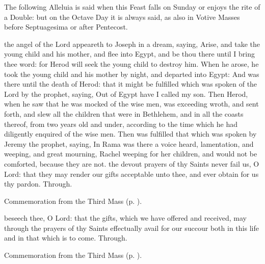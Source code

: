 \begin{rubric}
    The following Alleluia is said when this Feast falls on Sunday or enjoys the rite of a  Double: but on the Octave Day it is always said, as also in Votive Masses before Septuagesima or after Pentecost.
\end{rubric}
 the angel of the Lord appeareth to Joseph in a dream, saying, Arise, and take the young child and his mother, and flee into Egypt, and be thou there until I bring thee word: for Herod will seek the young child to destroy him. When he arose, he took the young child and his mother by night, and departed into Egypt: And was there until the death of Herod: that it might be fulfilled which was spoken of the Lord by the prophet, saying, Out of Egypt have I called my son. Then Herod, when he saw that he was mocked of the wise men, was exceeding wroth, and sent forth, and slew all the children that were in Bethlehem, and in all the coasts thereof, from two years old and under, according to the time which he had diligently enquired of the wise men. Then was fulfilled that which was spoken by Jeremy the prophet, saying, In Rama was there a voice heard, lamentation, and weeping, and great mourning, Rachel weeping for her children, and would not be comforted, because they are not.
\secret
{} the devout prayers of thy Saints never fail us, O Lord: that they may render our gifts acceptable unto thee, and ever obtain for us thy pardon. Through.
\begin{rubric}
    Commemoration  from the Third Mass (p. \pageref{NativityMassIIISecret}).
\end{rubric}
\postcommunion
{} beseech thee, O Lord: that the gifts, which we have offered and received, may through the prayers of thy Saints effectually avail for our succour both in this life and in that which is to come. Through.
\begin{rubric}
    Commemoration  from the Third Mass (p. \pageref{NativityMassIIIPostcommunion}).
\end{rubric}


